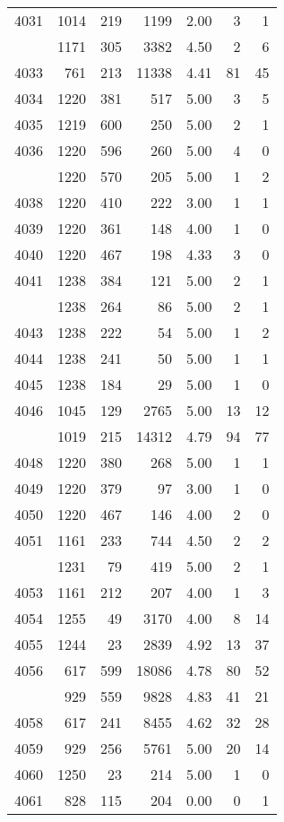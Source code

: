 \documentclass[
]{article}
\begin{document}
\begin{table}
\begin{tabular}[t]{lrrrrrr}
4031 & 1014 & 219 & 1199 & 2.00 & 3 & 1\\
\addlinespace
4032 & 1171 & 305 & 3382 & 4.50 & 2 & 6\\
4033 & 761 & 213 & 11338 & 4.41 & 81 & 45\\
4034 & 1220 & 381 & 517 & 5.00 & 3 & 5\\
4035 & 1219 & 600 & 250 & 5.00 & 2 & 1\\
4036 & 1220 & 596 & 260 & 5.00 & 4 & 0\\
\addlinespace
4037 & 1220 & 570 & 205 & 5.00 & 1 & 2\\
4038 & 1220 & 410 & 222 & 3.00 & 1 & 1\\
4039 & 1220 & 361 & 148 & 4.00 & 1 & 0\\
4040 & 1220 & 467 & 198 & 4.33 & 3 & 0\\
4041 & 1238 & 384 & 121 & 5.00 & 2 & 1\\
\addlinespace
4042 & 1238 & 264 & 86 & 5.00 & 2 & 1\\
4043 & 1238 & 222 & 54 & 5.00 & 1 & 2\\
4044 & 1238 & 241 & 50 & 5.00 & 1 & 1\\
4045 & 1238 & 184 & 29 & 5.00 & 1 & 0\\
4046 & 1045 & 129 & 2765 & 5.00 & 13 & 12\\
\addlinespace
4047 & 1019 & 215 & 14312 & 4.79 & 94 & 77\\
4048 & 1220 & 380 & 268 & 5.00 & 1 & 1\\
4049 & 1220 & 379 & 97 & 3.00 & 1 & 0\\
4050 & 1220 & 467 & 146 & 4.00 & 2 & 0\\
4051 & 1161 & 233 & 744 & 4.50 & 2 & 2\\
\addlinespace
4052 & 1231 & 79 & 419 & 5.00 & 2 & 1\\
4053 & 1161 & 212 & 207 & 4.00 & 1 & 3\\
4054 & 1255 & 49 & 3170 & 4.00 & 8 & 14\\
4055 & 1244 & 23 & 2839 & 4.92 & 13 & 37\\
4056 & 617 & 599 & 18086 & 4.78 & 80 & 52\\
\addlinespace
4057 & 929 & 559 & 9828 & 4.83 & 41 & 21\\
4058 & 617 & 241 & 8455 & 4.62 & 32 & 28\\
4059 & 929 & 256 & 5761 & 5.00 & 20 & 14\\
4060 & 1250 & 23 & 214 & 5.00 & 1 & 0\\
4061 & 828 & 115 & 204 & 0.00 & 0 & 1\\

\end{tabular}
\end{table}
\end{document}
